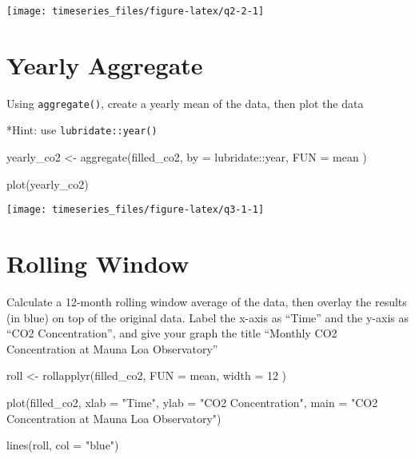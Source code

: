 \documentclass[
]{book}
\newenvironment{Shaded}{\begin{snugshade}}{\end{snugshade}}
\newcommand{\AttributeTok}[1]{\textcolor[rgb]{0.77,0.63,0.00}{#1}}
\newcommand{\DecValTok}[1]{\textcolor[rgb]{0.00,0.00,0.81}{#1}}
\newcommand{\FunctionTok}[1]{\textcolor[rgb]{0.00,0.00,0.00}{#1}}
\newcommand{\NormalTok}[1]{#1}
\newcommand{\OtherTok}[1]{\textcolor[rgb]{0.56,0.35,0.01}{#1}}
\newcommand{\SpecialCharTok}[1]{\textcolor[rgb]{0.00,0.00,0.00}{#1}}
\newcommand{\StringTok}[1]{\textcolor[rgb]{0.31,0.60,0.02}{#1}}
\begin{document}
\begin{center}\texttt{[image: timeseries\_files/figure-latex/q2-2-1]} \end{center}

\newpage

\hypertarget{yearly-aggregate}{%
\section{Yearly Aggregate}\label{yearly-aggregate}}

Using \texttt{aggregate()}, create a yearly mean of the data, then plot the data

*Hint: use \texttt{lubridate::year()}

\begin{Shaded}
\begin{Highlighting}[]
\NormalTok{yearly\_co2 }\OtherTok{\textless{}{-}} \FunctionTok{aggregate}\NormalTok{(filled\_co2,}
  \AttributeTok{by =}\NormalTok{ lubridate}\SpecialCharTok{::}\NormalTok{year,}
  \AttributeTok{FUN =}\NormalTok{ mean}
\NormalTok{)}


\FunctionTok{plot}\NormalTok{(yearly\_co2)}
\end{Highlighting}
\end{Shaded}

\begin{center}\texttt{[image: timeseries\_files/figure-latex/q3-1-1]} \end{center}

\newpage

\hypertarget{rolling-window}{%
\section{Rolling Window}\label{rolling-window}}

Calculate a 12-month rolling window average of the data, then overlay the results (in blue) on top of the original data. Label the x-axis as ``Time'' and the y-axis as ``CO2 Concentration'', and give your graph the title ``Monthly CO2 Concentration at Mauna Loa Observatory''

\begin{Shaded}
\begin{Highlighting}[]
\NormalTok{roll }\OtherTok{\textless{}{-}} \FunctionTok{rollapplyr}\NormalTok{(filled\_co2,}
  \AttributeTok{FUN =}\NormalTok{ mean,}
  \AttributeTok{width =} \DecValTok{12}
\NormalTok{)}

\FunctionTok{plot}\NormalTok{(filled\_co2,}
     \AttributeTok{xlab =} \StringTok{"Time"}\NormalTok{,}
     \AttributeTok{ylab =} \StringTok{"CO2 Concentration"}\NormalTok{,}
     \AttributeTok{main =} \StringTok{"CO2 Concentration at Mauna Loa Observatory"}\NormalTok{)}

\FunctionTok{lines}\NormalTok{(roll, }\AttributeTok{col =} \StringTok{"blue"}\NormalTok{)}
\end{Highlighting}
\end{Shaded}
\end{document}
